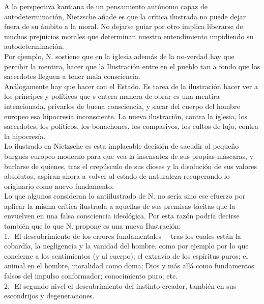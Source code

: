 \documentclass[a4paper, 10pt, twocolumn, spanish]{article}
\begin{document}
A la perspectiva kantiana de un pensamiento autónomo capaz de
autodeterminación, Nietzsche añade es que la crítica ilustrada no
puede dejar fuera de su ámbito a la moral. No dejarse guiar por otro
implica liberarse de muchos prejuicios morales que determinan nuestro
entendimiento impidiendo su autodeterminación.\\[0pt]
Por ejemplo, N. sostiene que en la iglesia además de la no-verdad hay
que percibir la mentira, hacer que la Ilustración entre en el pueblo
tan a fondo que los sacerdotes lleguen a tener mala consciencia.\\[0pt]
Análogamente hay que hacer con el Estado. Es tarea de la ilustración
hacer ver a los príncipes y políticos que s entera manera de obrar es
una mentira intencionada, privarlos de buena consciencia, y sacar del
cuerpo del hombre europeo esa hipocresía inconsciente. La nueva
ilustración, contra la iglesia, los sacerdotes, los políticos, los
bonachones, los compasivos, los cultos de lujo, contra la hipocresía.\\[0pt]

Lo ilustrado en Nietzsche es esta implacable decisión de sacudir al
pequeño burgués europeo moderno para que vea la insensatez de sus
propias máscaras, y burlarse de quienes, tras el crepúsculo de sus
dioses y la disolución de sus valores absolutos, aspiran ahora a
volver al estado de naturaleza recuperando lo originario como nuevo
fundamento.\\[0pt]
Lo que algunos consideran lo antiilustrado de N. no sería sino ese
efuerzo por aplicar la misma crítica ilustrada a aquellas de sus
premisas tácitas que la envuelven en una falsa consciencia
ideológica. Por esta razón podría decirse también que lo que
N. propone es una nueva Ilustración:\\[0pt]
1.- El descubrimiento de los errores fundamentales —tras los cuales
están la cobardía, la negligencia y la vanidad del hombre. como por
ejemplo por lo que concierne a los sentimientos (y al cuerpo); el
extravío de los espíritus puros; el animal en el hombre, moralidad
como doma; Dios y más allá como fundamentos falsos del impulso
conformador; conocimiento puro; etc.\\[0pt]
2.- El segundo nivel el descubrimiento del instinto creador, también en
sus escondrijos y degeneraciones.\\[0pt]
\end{document}
